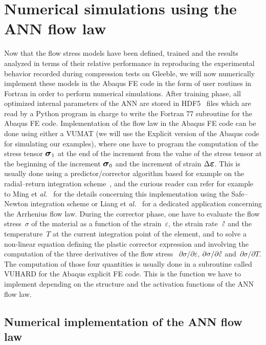 \documentclass[algorithms,article,submit,pdftex,oneauthors]{Definitions/mdpi}
\makeatletter
\DeclareRobustCommand{\mdot}[1]{\accentset{\mbox{\bfseries .}}{#1}}
\DeclareRobustCommand{\eal}{et \emph{al.}\@\xspace}
\DeclareRobustCommand{\Sig}{\mbox{\large\ensuremath{\boldsymbol{\sigma}}}}
\DeclareRobustCommand{\Eps}{\mbox{\large\ensuremath{\boldsymbol{\varepsilon}}}}
\makeatother
\begin{document}
\section{Numerical simulations using the ANN flow law}\label{sec:Numerical}
Now that the flow stress models have been defined, trained and the results analyzed in terms of their relative performance in reproducing the experimental behavior recorded during compression tests on Gleeble, we will now numerically implement these models in the Abaqus FE code in the form of user routines in Fortran in order to perform numerical simulations.
After training phase, all optimized internal parameters of the ANN are stored in HDF5~\cite{Koranne-2011-HDF} files which are read by a Python program in charge to write the Fortran 77 subroutine for the Abaqus FE code.
Implementation of the flow law in the Abaqus FE code can be done using either a VUMAT (we will use the Explicit version of the Abaqus code for simulating our examples), where one have to program the computation of the stress tensor $\Sig_1$ at the end of the increment from the value of the stress tensor at the beginning of the increment $\Sig_0$ and the increment of strain $\Delta\Eps$.
This is usually done using a predictor/corrector algorithm based for example on the radial--return integration scheme~\cite{Ponthot-2002-USU}, and the curious reader can refer for example to Ming \eal~\cite{Ming-2018-ERV} for the details concerning this implementation using the Safe--Newton integration scheme or Liang \eal~\cite{Liang-2022} for a dedicated application concerning the Arrhenius flow law.
During the corrector phase, one have to evaluate the flow stress~$\sigma$ of the material as a function of the strain~$\varepsilon$, the strain rate~$\mdot{\varepsilon}$ and the temperature~$T$ at the current integration point of the element, and to solve a non-linear equation defining the plastic corrector expression and involving the computation of the three derivatives of the flow stress ~$\partial\sigma/\partial\varepsilon$, $\partial\sigma/\partial\mdot{\varepsilon}$ and~$\partial\sigma/\partial T$.
The computation of those four quantities is usually done in a subroutine called VUHARD for the Abaqus explicit FE code.
This is the function we have to implement depending on the structure and the activation functions of the ANN flow law.

\subsection{Numerical implementation of the ANN flow law}\label{subsec:Num-impl}
\end{document}
